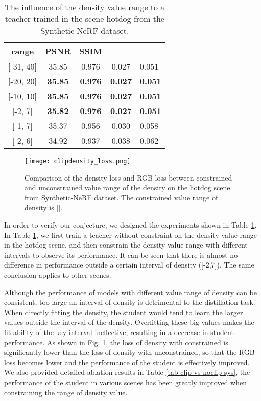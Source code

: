 \documentclass[letterpaper]{article} \usepackage{aaai23}  \usepackage{times}  \usepackage{helvet}  \usepackage{courier}  \usepackage[hyphens]{url}  \usepackage{graphicx} \urlstyle{rm} \def\UrlFont{\rm}  \usepackage{natbib}  \usepackage{caption} \frenchspacing  \setlength{\pdfpagewidth}{8.5in}  \setlength{\pdfpageheight}{11in}  \usepackage{multirow}
\begin{document}
\begin{table}[h]
\begin{tabular}{ccccl}
\hline
range                  & PSNR           & SSIM           &     &      \\ \hline
{[}-31, 40{]} & 35.85          & 0.976          & 0.027          & 0.051          \\ \hline
{[}-20, 20{]}          & \textbf{35.85} & \textbf{0.976} & \textbf{0.027} & \textbf{0.051} \\
{[}-10, 10{]}          & \textbf{35.85} & \textbf{0.976} & \textbf{0.027} & \textbf{0.051} \\
{[}-2, 7{]}            & \textbf{35.82} & \textbf{0.976} & \textbf{0.027} & \textbf{0.051} \\
{[}-1, 7{]}            & 35.37          & 0.956          & 0.030          & 0.058          \\
{[}-2, 6{]}            & 34.92          & 0.937          & 0.038          & 0.062          \\ \hline
\end{tabular}
\caption{The influence of the density value range to a teacher trained in the scene hotdog from the Synthetic-NeRF dataset.}
\label{tab-clip-for-teacher}
\end{table}


\begin{figure}[ht]
    \centering
    \texttt{[image: clipdensity\_loss.png]} \caption{Comparison of the density loss and RGB loss between constrained and unconstrained value range of the density on the hotdog scene from Synthetic-NeRF dataset. The constrained value range of density is []. }
    \label{fig-clip-vs-noclip-loss}
\end{figure}

In order to verify our conjecture, we designed the experiments shown in Table \ref{tab-clip-for-teacher}. In Table \ref{tab-clip-for-teacher}, we first train a teacher without constraint on the density value range in the hotdog scene, and then constrain the density value range with different intervals to observe its performance. It can be seen that there is almost no difference in performance outside a certain interval of density ([-2,7]). The same conclusion applies to other scenes.

Although the performance of models with different value range of density can be consistent, too large an interval of density is detrimental to the distillation task. When directly fitting the density, the student would tend to learn the larger values outside the interval of the density. Overfitting these big values makes the fit ability of the key interval ineffective, resulting in a decrease in student performance. As shown in Fig. \ref{fig-clip-vs-noclip-loss}, the loss of density with constrained is significantly lower than the loss of density with unconstrained, so that the RGB loss becomes lower and the performance of the student is effectively improved. We also provided detailed ablation results in Table \ref{tab-clip-vs-noclip-sys}, the performance of the student in various scenes has been greatly improved when constraining the range of density value.
\end{document}
